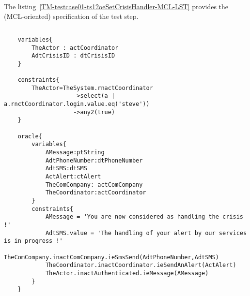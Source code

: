 	
	
		
	\vspace{1cm}
	The listing~\ref{TM-testcase01-ts12oeSetCrisisHandler-MCL-LST} provides the \msrmessir (MCL-oriented) specification of the test step.
	
	\scriptsize
	\vspace{0.5cm}
	\begin{lstlisting}[style=MessirStyle,firstnumber=auto,captionpos=b,caption={\msrmessir (MCL-oriented) specification of the test step \emph{testcase01-ts12oeSetCrisisHandler}.},label=TM-testcase01-ts12oeSetCrisisHandler-MCL-LST]

	variables{
		TheActor : actCoordinator
		AdtCrisisID : dtCrisisID
	}
	
	constraints{
		TheActor=TheSystem.rnactCoordinator
		            ->select(a | a.rnctCoordinator.login.value.eq('steve'))
		            ->any2(true)
	}
	
	oracle{
		variables{
			AMessage:ptString
			AdtPhoneNumber:dtPhoneNumber
			AdtSMS:dtSMS
			ActAlert:ctAlert
			TheComCompany: actComCompany
			TheCoordinator:actCoordinator
		}
		constraints{
			AMessage = 'You are now considered as handling the crisis !'
			AdtSMS.value = 'The handling of your alert by our services is in progress !'
			TheComCompany.inactComCompany.ieSmsSend(AdtPhoneNumber,AdtSMS)
			TheCoordinator.inactCoordinator.ieSendAnAlert(ActAlert)
			TheActor.inactAuthenticated.ieMessage(AMessage)
		}
	}
	
	\end{lstlisting}
	\normalsize 
	
	
